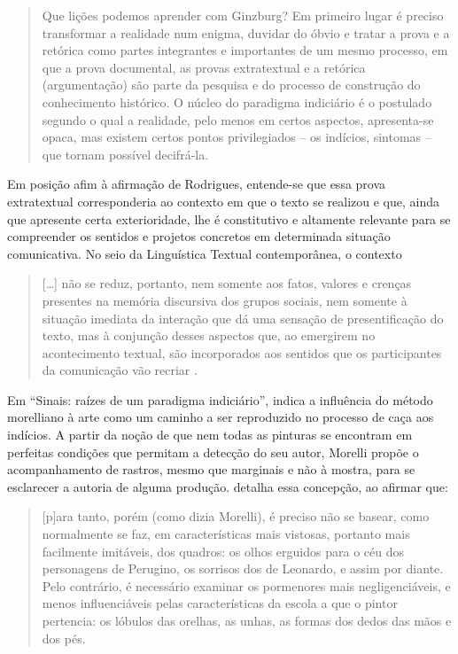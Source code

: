 \documentclass[portuguese]{textolivre}
\begin{document}
\begin{quote}
    Que lições podemos aprender com Ginzburg? Em primeiro lugar é preciso transformar a realidade num enigma, duvidar do óbvio e tratar a prova e a retórica como partes integrantes e importantes de um mesmo processo, em que a prova documental, as provas extratextual e a retórica (argumentação) são parte da pesquisa e do processo de construção do conhecimento histórico. O núcleo do paradigma indiciário é o postulado segundo o qual a realidade, pelo menos em certos aspectos, apresenta-se opaca, mas existem certos pontos privilegiados – os indícios, sintomas – que tornam possível decifrá-la.
\end{quote}

Em posição afim à afirmação de Rodrigues, entende-se que essa prova extratextual corresponderia ao contexto em que o texto se realizou e que, ainda que apresente certa exterioridade, lhe é constitutivo e altamente relevante para se compreender os sentidos e projetos concretos em determinada situação comunicativa. No seio da Linguística Textual contemporânea, o contexto

\begin{quote}
    […] não se reduz, portanto, nem somente aos fatos, valores e crenças presentes na memória discursiva dos grupos sociais, nem somente à situação imediata da interação que dá uma sensação de presentificação do texto, mas à conjunção desses aspectos que, ao emergirem no acontecimento textual, são incorporados aos sentidos que os participantes da comunicação vão recriar \cite[p. 27]{cavalcante2022linguistica}.
\end{quote}

Em “Sinais: raízes de um paradigma indiciário”, \textcite{ginzburg1986mitos} indica a influência do método morelliano à arte como um caminho a ser reproduzido no processo de caça aos indícios. A partir da noção de que nem todas as pinturas se encontram em perfeitas condições que permitam a detecção do seu autor, Morelli propõe o acompanhamento de rastros, mesmo que marginais e não à mostra, para se esclarecer a autoria de alguma produção. \textcite[p. 144]{ginzburg1986mitos} detalha essa concepção, ao afirmar que:

\begin{quote}
    [p]ara tanto, porém (como dizia Morelli), é preciso não se basear, como normalmente se faz, em características mais vistosas, portanto mais facilmente imitáveis, dos quadros: os olhos erguidos para o céu dos personagens de Perugino, os sorrisos dos de Leonardo, e assim por diante. Pelo contrário, é necessário examinar os pormenores mais negligenciáveis, e menos influenciáveis pelas características da escola a que o pintor pertencia: os lóbulos das orelhas, as unhas, as formas dos dedos das mãos e dos pés.
\end{quote}
\end{document}
